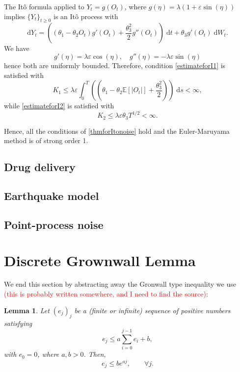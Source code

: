 \documentclass[reqno,12pt]{amsart}
\theoremstyle{plain}%
\newtheorem{lem}{Lemma}[section]
\theoremstyle{definition}
\begin{document}
The It\^o formula applied to $Y_t = g(O_t)$, where $g(\eta) = \lambda (1 + \varepsilon \sin(\eta))$ implies $\{Y_t\}_{t\geq 0}$ is an It\^o process with
\[
    \mathrm{d}Y_t = \left((\theta_1 - \theta_2 O_t)g'(O_t) + \frac{\theta_3^2}{2}g''(O_t)\right)\;\mathrm{d}t + \theta_3 g'(O_t)\;\mathrm{d}W_t.
\]
We have
\[
    g'(\eta) = \lambda \varepsilon \cos(\eta), \quad g''(\eta) = -\lambda\varepsilon\sin(\eta)
\]
hence both are uniformly bounded. Therefore, condition \eqref{estimateforI1} is satisfied with
\[
    K_1 \leq \lambda\varepsilon \int_0^T \left( (\theta_1 - \theta_2 \mathbb{E}[|O_t|] + \frac{\theta_3^2}{2})\right) \;\mathrm{d}s < \infty,
\]
while \eqref{estimateforI2} is satisfied with
\[
    K_2 \leq \lambda\varepsilon\theta_3 T^{1/2} < \infty.
\]

Hence, all the conditions of \cref{thmforItonoise} hold and the Euler-Maruyama method is of strong order 1.






\subsection{Drug delivery}

\subsection{Earthquake model}

\subsection{Point-process noise}

\appendix{}

\section{Discrete Grownwall Lemma}

We end this section by abstracting away the Gronwall type inequality we use \textcolor{red}{(this is probably written somewhere, and I need to find the source)}:
\begin{lem}
Let $(e_j)_j$ be a (finite or infinite) sequence of positive numbers satisfying
\begin{equation}
  \label{integralgronwall}
  e_j \leq a \sum_{i=0}^{j-1} e_i + b,
\end{equation}
with $e_0 = 0$, where $a, b > 0$. Then,
\begin{equation}
  \label{estimateintegralgronwall}
  e_j \leq b e^{aj}, \qquad \forall j.
\end{equation}
\end{lem}
\end{document}
